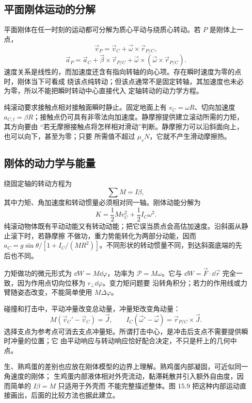 \subsection*{平面刚体运动的分解}

平面刚体在任一时刻的运动都可分解为质心平动与绕质心转动。若 $P$ 是刚体上一点，
\[
 \vec v_P=\vec v_C+\vec\omega\times\vec r_{P/C},
\]
\[
 \vec a_P=\vec a_C+\vec\beta\times\vec r_{P/C}
 +\vec\omega\times(\vec\omega\times\vec r_{P/C}).
\]
速度关系是线性的，而加速度还含有指向转轴的向心项。存在瞬时速度为零的点时，刚体当下可看成
绕该点纯转动；但该点通常不是固定转轴，其加速度也未必为零，所以不能把瞬时转动中心直接代入
定轴转动的动力学方程。

纯滚动要求接触点相对接触面瞬时静止。固定地面上有 $v_C=\omega R$、切向加速度
$a_{C,t}=\beta R$；接触点仍可具有非零法向加速度。静摩擦提供建立滚动所需的力矩，其方向要由
“若无摩擦接触点将怎样相对滑动”判断。静摩擦力可以沿斜面向上，也可以向下，甚至为零；只要
所需值不超过 $\mu_sN$，它就不产生滑动摩擦热。

\subsection*{刚体的动力学与能量}

绕固定轴的转动方程为
\[
 \sum M=I\beta,
\]
其中力矩、角加速度和转动惯量必须相对同一轴。刚体动能分解为
\[
 K=\frac12Mv_C^2+\frac12I_C\omega^2.
\]
纯滚动物体既有平动动能又有转动动能；把它误当质点会高估加速度。沿斜面从静止滚下时，若静摩擦
不做功，重力势能转化为两部分动能，因而
$a_C=g\sin\theta/[1+I_C/(MR^2)]$。不同形状的转动惯量不同，到达斜面底端的先后也不同。

力矩做功的微元形式为 $\dd W=M\dd\varphi$，功率为 $\mathcal P=M\omega$。它与
$\dd W=\vec F\cdot\dd\vec r$ 完全一致，因为作用点切向位移为 $r_\perp\dd\varphi$。变力矩问题要
沿转角积分；若力的作用线或力臂随姿态改变，不能简单使用 $M\Delta\varphi$。

碰撞和打击中，平动冲量改变总动量，冲量矩改变角动量：
\[
 M(\vec v_C'-\vec v_C)=\vec J,
 \qquad
 I_C(\vec\omega'-\vec\omega)=\vec r_{P/C}\times\vec J.
\]
选择支点为参考点可消去支点冲量矩。所谓打击中心，是冲击后支点不需要提供瞬时冲量的位置；它
由平动响应与转动响应恰好配合决定，不只是杆上的几何中点。

生、熟鸡蛋的差别也应放在刚体模型的边界上理解。熟鸡蛋内部凝固，可近似同一角速度的刚体；
生鸡蛋内部液体相对外壳流动，黏滞耗散并引入额外自由度，因而简单的 $I\beta=M$ 只适用于外壳而
不能完整描述整体。图 15.9 把这种内部运动直接画出，后面的比较方法也据此建立。

